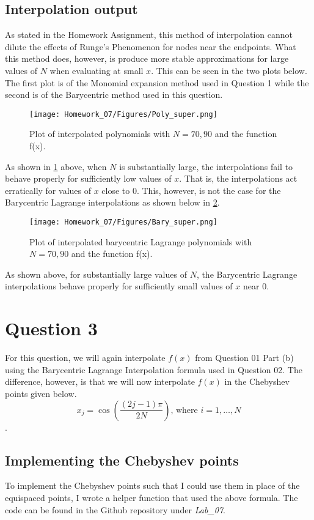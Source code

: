 \documentclass{article}
\begin{document}
\subsection{Interpolation output}
As stated in the Homework Assignment, this method of interpolation cannot dilute the effects of Runge's Phenomenon for nodes near the endpoints. What this method does, however, is produce more stable approximations for large values of \(N\) when evaluating at small \(x\). This can be seen in the two plots below. The first plot is of the Monomial expansion method used in Question 1 while the second is of the Barycentric method used in this question.
\newpage
\begin{figure}[h!]
    \centering
    \texttt{[image: Homework\_07/Figures/Poly\_super.png]}
    \caption{Plot of interpolated polynomials with \(N=70,90\) and the function f(x).}
    \label{fig:Poly_Super}
\end{figure}
As shown in \ref{fig:Poly_Super} above, when \(N\) is substantially large, the interpolations fail to behave properly for sufficiently low values of \(x\). That is, the interpolations act erratically for values of \(x\) close to \(0\). This, however, is not the case for the Barycentric Lagrange interpolations as shown below in \ref{fig:Bary_Super}.
\begin{figure}[h!]
    \centering
    \texttt{[image: Homework\_07/Figures/Bary\_super.png]}
    \caption{Plot of interpolated barycentric Lagrange polynomials with \(N=70,90\) and the function f(x).}
    \label{fig:Bary_Super}
\end{figure}
As shown above, for substantially large values of \(N\), the Barycentric Lagrange interpolations behave properly for sufficiently small values of \(x\) near \(0\).

\section{Question 3}
For this question, we will again interpolate \(f(x)\) from Question 01 Part (b) using the Barycentric Lagrange Interpolation formula used in Question 02. The difference, however, is that we will now interpolate \(f(x)\) in the Chebyshev points given below.
\[
x_j = \cos{\left(\frac{(2j-1)\pi}{2N}\right)} \mbox{, where }i=1,\dots,N
\].

\subsection{Implementing the Chebyshev points}
To implement the Chebyshev points such that I could use them in place of the equispaced points, I wrote a helper function that used the above formula. The code can be found in the Github repository under \textit{Lab\_07}.
\end{document}
